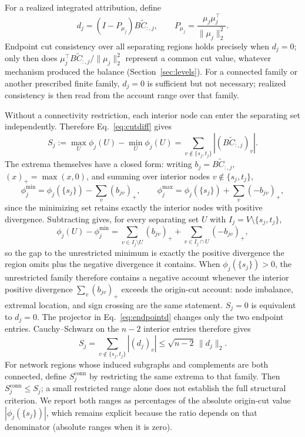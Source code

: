 \documentclass[a4paper,fleqn]{cas-sc}
\newcommand{\norm}[1]{\lVert #1 \rVert}
\begin{document}
For a realized integrated attribution, define
\begin{equation}
d_j=(I-P_{\mu_j})B\widetilde C_{:,j},\qquad
P_{\mu_j}=\frac{\mu_j\mu_j^\top}{\norm{\mu_j}_2^2}.
\label{eq:endpointd}
\end{equation}
Endpoint cut consistency over all separating regions holds precisely when
$d_j=0$; only then does
$\mu_j^\top B\widetilde C_{:,j}/\norm{\mu_j}_2^2$ represent a common cut
value, whatever mechanism produced the balance
(Section~\ref{sec:levels}). For a connected family or another prescribed
finite family, $d_j=0$ is sufficient but not necessary; realized
consistency is then read from the account range over that family.

Without a connectivity restriction, each interior node can enter the
separating set independently. Therefore Eq.~\eqref{eq:cutdiff} gives
\begin{equation}
S_j:=\max_U\phi_j(U)-\min_U\phi_j(U)
=\sum_{v\notin\{s_j,t_j\}}|(B\widetilde C_{:,j})_v|.
\label{eq:cutspread}
\end{equation}
The extrema themselves have a closed form: writing $b_j=B\widetilde
C_{:,j}$, $(x)_+=\max(x,0)$, and summing over interior nodes
$v\notin\{s_j,t_j\}$,
\begin{equation}
\phi_j^{\min}=\phi_j(\{s_j\})-\sum_v(b_{jv})_+,
\qquad
\phi_j^{\max}=\phi_j(\{s_j\})+\sum_v(-b_{jv})_+,
\label{eq:cutextrema}
\end{equation}
since the minimizing set retains exactly the interior nodes with
positive divergence. Subtracting gives, for every separating set $U$
with $I_j=V\setminus\{s_j,t_j\}$,
\begin{equation}
\phi_j(U)-\phi_j^{\min}
=\sum_{v\in I_j\setminus U}(b_{jv})_+
+\sum_{v\in I_j\cap U}(-b_{jv})_+,
\label{eq:cutgap}
\end{equation}
so the gap to the unrestricted minimum is exactly the positive
divergence the region omits plus the negative divergence it contains.
When $\phi_j(\{s_j\})>0$, the unrestricted family
therefore contains a negative account whenever the interior positive
divergence $\sum_v(b_{jv})_+$ exceeds the origin-cut account: node
imbalance, extremal location, and sign crossing are the same statement.
$S_j=0$ is equivalent to $d_j=0$.
The projector in Eq.~\eqref{eq:endpointd} changes only the two endpoint
entries. Cauchy--Schwarz on the $n-2$ interior entries therefore gives
\begin{equation}
S_j=\sum_{v\notin\{s_j,t_j\}}|(d_j)_v|
\le\sqrt{n-2}\,\norm{d_j}_2.
\label{eq:rangebound}
\end{equation}
For network regions whose induced subgraphs and complements are both
connected, define $S_j^{\mathrm{conn}}$ by restricting the same extrema to
that family. Then $S_j^{\mathrm{conn}}\le S_j$; a small restricted range
alone does not establish the full structural criterion. We report both
ranges as percentages of the absolute origin-cut value
$|\phi_j(\{s_j\})|$, which remains explicit because the ratio depends
on that denominator (absolute ranges when it is zero).
\end{document}
